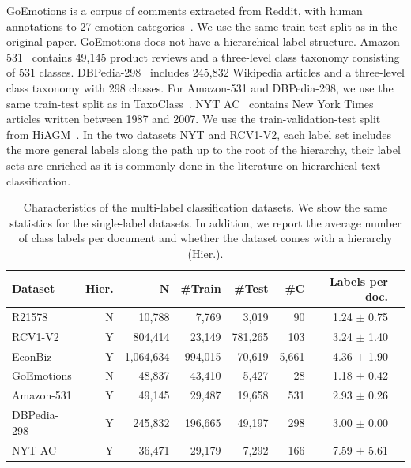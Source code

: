 \documentclass[acmsmall,nonacm]{acmart}
\begin{document}
GoEmotions is a corpus of comments extracted from Reddit, with human annotations to 27 emotion categories~\cite{demszky2020goemotions}. 
We use the same train-test split as in the original paper. 
GoEmotions does not have a hierarchical label structure. Amazon-531~\cite{hiddenfactors} contains
49,145 product reviews and a three-level class taxonomy consisting of 531 classes. 
DBPedia-298~\cite{Lehmann2015DBpediaA} includes 245,832 Wikipedia articles and a three-level class taxonomy with 298 classes. For Amazon-531 and DBPedia-298, we use the same train-test split as in TaxoClass~\cite{shen-etal-2021-taxoclass}.
NYT AC~\cite{sandhaus} contains New York Times articles written between 1987 and 2007. We use the train-validation-test split from HiAGM~\cite{hiagm}.
In the two datasets NYT and RCV1-V2, each label set includes the more general labels along the path up to the root of the hierarchy, \ie their label sets are enriched as it is commonly done in the literature on hierarchical text classification.

\begin{table}[ht]
    \centering
    \caption{Characteristics of the multi-label classification datasets. 
    We show the same statistics for the single-label datasets.
    In addition, we report the average number of class labels per document and whether the dataset comes with a hierarchy (Hier.).
    }
    \label{tab:multilabeldatasets}
    \begin{tabular}{lrrrrrrr}
    \toprule
    \textbf{Dataset} & \textbf{Hier.} & \textbf{N} & \textbf{\#Train} & \textbf{\#Test} & \textbf{\#C}  & \textbf{Labels per doc.} \\    
    \midrule                                                               
    R21578   & N & 10,788  & 7,769  & 3,019 & 90  &  1.24 $\pm$ 0.75   \\ 
    RCV1-V2  & Y   &  804,414  & 23,149   & 781,265 & 103  & 3.24 $\pm$ 1.40  \\ 
    EconBiz  &  Y & 1,064,634  & 994,015  & 70,619 & 5,661  & 4.36 $\pm$ 1.90  \\ 
    GoEmotions  & N  & 48,837  & 43,410  & 5,427 & 28   & 1.18 $\pm$ 0.42   \\ 
    Amazon-531  &  Y   & 49,145  &  29,487  &  19,658  & 531 & 2.93 $\pm$ 0.26  \\  
    DBPedia-298  &  Y   &  245,832  &  196,665  & 49,197 & 298   & 3.00 $\pm$ 0.00\\ 
    NYT AC  & Y   &  36,471  & 29,179    & 7,292 & 166 &  7.59 $\pm$ 5.61  \\   
   \bottomrule
    \end{tabular}
\end{table}
\end{document}
